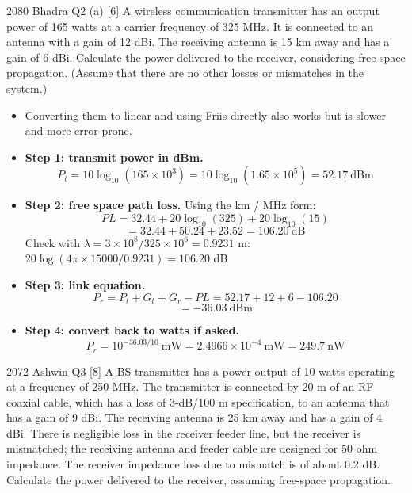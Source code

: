 \hr

{\color{sub}\footnotesize {} }

\begin{asked}{2080 Bhadra \textperiodcentered{} Q2 (a) \textperiodcentered{} [6]}
A wireless communication transmitter has an output power of 165 watts at a carrier frequency of
325 MHz. It is connected to an antenna with a gain of 12 dBi. The receiving antenna is 15 km
away and has a gain of 6 dBi. Calculate the power delivered to the receiver, considering
free-space propagation. (Assume that there are no other losses or mismatches in the system.)
\end{asked}

\begin{itemize}
  \item {} Converting them to linear and
        using Friis directly also works but is slower and more error-prone.
  \item \textbf{Step 1: transmit power in dBm.}
        \[ P_t = 10\log_{10}(165 \times 10^{3}) = 10\log_{10}(1.65\times10^{5})
               = 52.17\ \text{dBm} \]
  \item \textbf{Step 2: free space path loss.} Using the km / MHz form:
        \[ PL = 32.44 + 20\log_{10}(325) + 20\log_{10}(15) \]
        \[ = 32.44 + 50.24 + 23.52 = 106.20\ \text{dB} \]
        {\color{sub}\footnotesize Check with $\lambda = 3\times10^8/325\times10^6 = 0.9231$ m:
        $20\log(4\pi \times 15000/0.9231) = 106.20$ dB \checkmark}
  \item \textbf{Step 3: link equation.}
        \[ P_r = P_t + G_t + G_r - PL = 52.17 + 12 + 6 - 106.20 \]
        \[ = \boxed{-36.03\ \text{dBm}} \]
  \item \textbf{Step 4: convert back to watts if asked.}
        \[ P_r = 10^{-36.03/10}\ \text{mW} = 2.4966\times10^{-4}\ \text{mW}
               = \boxed{249.7\ \text{nW}} \]
\end{itemize}

\hr

{\color{sub}\footnotesize {} }

\begin{asked}{2072 Ashwin \textperiodcentered{} Q3 \textperiodcentered{} [8]}
A BS transmitter has a power output of 10 watts operating at a frequency of 250 MHz. The
transmitter is connected by 20 m of an RF coaxial cable, which has a loss of 3-dB/100 m
specification, to an antenna that has a gain of 9 dBi. The receiving antenna is 25 km away and
has a gain of 4 dBi. There is negligible loss in the receiver feeder line, but the receiver is
mismatched; the receiving antenna and feeder cable are designed for 50 ohm impedance. The
receiver impedance loss due to mismatch is of about 0.2 dB. Calculate the power delivered to
the receiver, assuming free-space propagation.
\end{asked}

